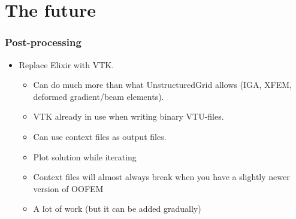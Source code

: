 \documentclass[11pt]{beamer} %
\begin{document}
\section{The future}
\begin{frame}
 \frametitle{Post-processing}
 \begin{itemize}
  \item Replace Elixir with VTK.
   \begin{itemize}
    \item[\smiley] Can do much more than what UnstructuredGrid allows (IGA, XFEM, deformed gradient/beam elements).
    \item[\smiley] VTK already in use when writing binary VTU-files.
    \item[\smiley] Can use context files as output files.
    \item[\smiley] Plot solution while iterating
    \item[\frownie] Context files will almost always break when you have a slightly newer version of OOFEM
    \item[\frownie] A lot of work (but it can be added gradually)
   \end{itemize}
 \end{itemize}
\end{frame}
\end{document}
